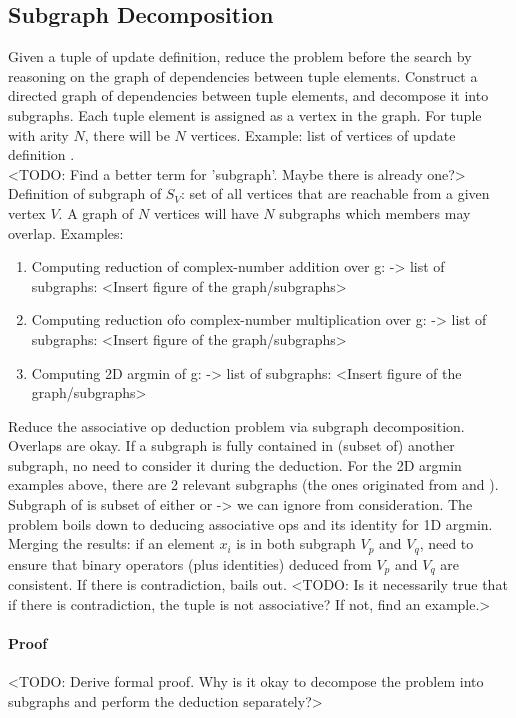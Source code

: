 \subsection{Subgraph Decomposition}

Given a tuple of update definition, reduce the problem before the search by reasoning on the graph of dependencies between tuple elements. Construct a directed graph of dependencies between tuple elements, and decompose it into subgraphs. Each tuple element is assigned as a vertex in the graph. For tuple with arity $N$, there will be $N$ vertices. Example: list of vertices of update definition . \\

<TODO: Find a better term for 'subgraph'. Maybe there is already one?> \\

Definition of subgraph of $S_V$: set of all vertices that are reachable from a given vertex $V$. A graph of $N$ vertices will have $N$ subgraphs which members may overlap. Examples:
\begin{enumerate}
 \item Computing reduction of complex-number addition over g:  -> list of subgraphs:  <Insert figure of the graph/subgraphs>
 \item Computing reduction ofo complex-number multiplication over g:  -> list of subgraphs:  <Insert figure of the graph/subgraphs>
 \item Computing 2D argmin of g:  -> list of subgraphs:  <Insert figure of the graph/subgraphs>
\end{enumerate}

Reduce the associative op deduction problem via subgraph decomposition. Overlaps are okay. If a subgraph is fully contained in (subset of) another subgraph, no need to consider it during the deduction. For the 2D argmin examples above, there are 2 relevant subgraphs (the ones originated from  and ). Subgraph of  is subset of either  or  -> we can ignore  from consideration. The problem boils down to deducing associative ops and its identity for 1D argmin. Merging the results: if an element $x_i$ is in both subgraph $V_p$ and $V_q$, need to ensure that binary operators (plus identities) deduced from $V_p$ and $V_q$ are consistent. If there is contradiction, bails out. <TODO: Is it necessarily true that if there is contradiction, the tuple is not associative? If not, find an example.> \\

\paragraph{Proof}
<TODO: Derive formal proof. Why is it okay to decompose the problem into subgraphs and perform the deduction separately?> \\
